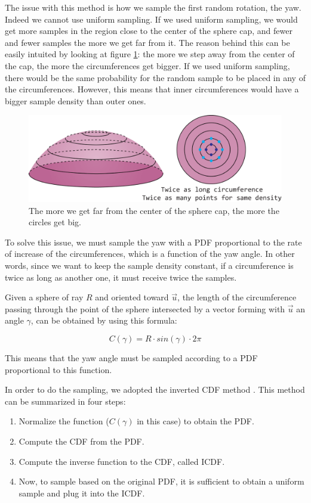 \documentclass{PoliMi_MasterThesis}
\begin{document}
The issue with this method is how we sample the first random rotation, the yaw. Indeed we cannot use uniform sampling. If we used uniform sampling, we would get more samples in the region close to the center of the sphere cap, and fewer and fewer samples the more we get far from it. The reason behind this can be easily intuited by looking at figure \ref{fig:concentric_circles}: the more we step away from the center of the cap, the more the circumferences get bigger. If we used uniform sampling, there would be the same probability for the random sample to be placed in any of the circumferences. However, this means that inner circumferences would have a bigger sample density than outer ones.

\begin{figure}[H]
    \centering
    \includegraphics[width=\textwidth*\real{0.65}]{Images/sphere_cap_density.png} 
    \caption{The more we get far from the center of the sphere cap, the more the circles get big.}
    \label{fig:concentric_circles}
\end{figure}

To solve this issue, we must sample the yaw with a PDF proportional to the rate of increase of the circumferences, which is a function of the yaw angle. In other words, since we want to keep the sample density constant, if a circumference is twice as long as another one, it must receive twice the samples.

Given a sphere of ray $R$ and oriented toward $\overrightarrow{u}$, the length of the circumference passing through the point of the sphere intersected by a vector forming with $\overrightarrow{u}$ an angle $\gamma$, can be obtained by using this formula:

$$C(\gamma) = R \cdot sin(\gamma) \cdot 2\pi$$

This means that the yaw angle must be sampled according to a PDF proportional to this function.

In order to do the sampling, we adopted the inverted CDF method \cite{inverse_cdf}. This method can be summarized in four steps:
\begin{enumerate}
	\item Normalize the function ($C(\gamma)$ in this case) to obtain the PDF.
	\item Compute the CDF from the PDF.
	\item Compute the inverse function to the CDF, called ICDF.
	\item Now, to sample based on the original PDF, it is sufficient to obtain a uniform sample and plug it into the ICDF.
\end{enumerate}
\end{document}
